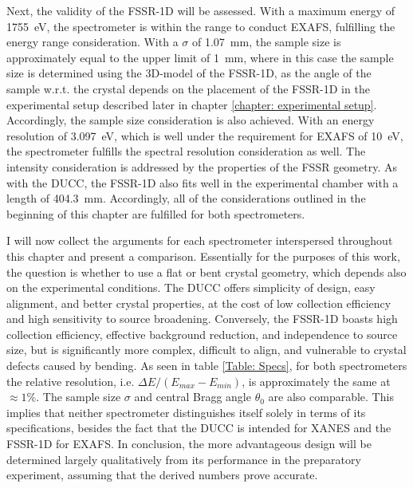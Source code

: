 Next, the validity of the FSSR-1D will be 
assessed. With a 
maximum energy of 
\SI{1755}{\electronvolt}, the spectrometer is within 
the range to conduct EXAFS, fulfilling the energy 
range consideration. With a $\sigma$ of \SI{1.07}{\milli\meter}, the sample size is approximately equal to the upper limit of \SI{1}{\milli\meter},
where in this case the sample size is determined 
using the 3D-model of the FSSR-1D, 
as the angle of the sample w.r.t. the crystal depends on the 
placement of the FSSR-1D in the experimental setup described later in chapter \ref{chapter: experimental setup}. 
Accordingly, the sample size consideration is also 
achieved. With an energy resolution of 
\SI{3.097}{\electronvolt}, which is well under the 
requirement for EXAFS of \SI{10}{\electronvolt}, the 
spectrometer fulfills the spectral resolution 
consideration as well. The intensity 
consideration is addressed by the 
properties of the FSSR geometry. As with the DUCC, the FSSR-1D also 
fits well in the experimental chamber with a length of \SI{404.3}{\milli\meter}. Accordingly, all of the 
considerations outlined in the beginning of this 
chapter are fulfilled for both spectrometers.

I will now collect the arguments for each spectrometer interspersed 
throughout this chapter and present a comparison. Essentially for the 
purposes of this work, the question is whether to use a flat or bent 
crystal geometry, which depends also on the experimental conditions. The 
DUCC offers simplicity of design, easy alignment, and better crystal 
properties, at the cost of low collection efficiency and high 
sensitivity to source broadening. Conversely, the FSSR-1D boasts high 
collection efficiency, effective background reduction, and independence 
to source size, but is significantly more complex, difficult to align, 
and vulnerable to crystal defects caused by bending. As seen in table 
\ref{Table: Specs}, for both spectrometers the relative resolution, i.e. 
$\Delta E/(E_{max}-E_{min})$, is approximately the same at $\approx 1 
\%$. The sample size $\sigma$ and central Bragg angle $\theta_0$ are 
also comparable. This implies that neither spectrometer distinguishes 
itself solely in terms of its specifications, besides the fact that the DUCC is 
intended for XANES and the FSSR-1D for EXAFS. In conclusion, the more 
advantageous design will be determined largely qualitatively from its 
performance in the preparatory experiment, assuming that the derived 
numbers prove accurate.

